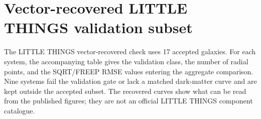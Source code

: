 ﻿\documentclass[twocolumn]{aastex631}
\begin{document}
\appendix
\section{Vector-recovered LITTLE THINGS validation subset}
The LITTLE THINGS vector-recovered check uses 17 accepted galaxies.  For each system, the accompanying table gives the validation class, the number of radial points, and the SQRT/FREEP RMSE values entering the aggregate comparison.  Nine systems fail the validation gate or lack a matched dark-matter curve and are kept outside the accepted subset.  The recovered curves show what can be read from the published figures; they are not an official LITTLE THINGS component catalogue.

\begingroup
\scriptsize


\endgroup
\end{document}
